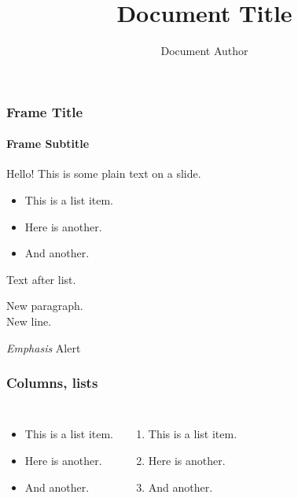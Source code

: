 \title{Document Title}
\author{Document Author}



\begin{frame}
\maketitle
\end{frame}


\begin{frame}
\frametitle{Frame Title}
\framesubtitle{Frame Subtitle}

Hello! This is some plain text on a slide.

\begin{itemize}
\item This is a list item.
\item Here is another.
\item And another.
\end{itemize}

Text after list.

New paragraph.
\\ New line.

\emph{Emphasis} \quad {} \quad \alert{Alert} \quad {}

 \quad {} \quad {} \quad {} \quad {}
\end{frame}


\begin{frame}\frametitle{Columns, lists}
\begin{columns}
\begin{itemize}
\item This is a list item.
\item Here is another.
\item And another.
\end{itemize}

\begin{enumerate}
\item This is a list item.
\item Here is another.
\item And another.
\end{enumerate}
\end{columns}

\end{frame}


